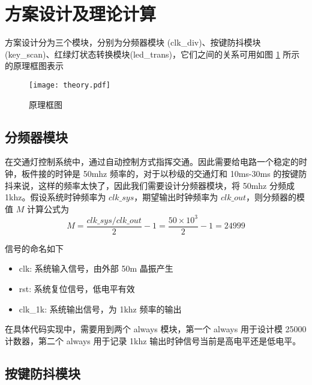 \documentclass[12pt,AutoFakeBold]{article}
\begin{document}
\section{方案设计及理论计算}

方案设计分为三个模块，分别为分频器模块 (clk\_div)、按键防抖模块 (key\_scan)、红绿灯状态转换模块(led\_trans)，它们之间的关系可用如图 \ref{fig:theory} 所示的原理框图表示

\begin{figure}[hbtp]
	\centering
	\texttt{[image: theory.pdf]}
	\caption{原理框图}\label{fig:theory}
\end{figure}

\subsection{分频器模块}

在交通灯控制系统中，通过自动控制方式指挥交通。因此需要给电路一个稳定的时钟，板件接的时钟是 50mhz 频率的，对于以秒级的交通灯和 10ms-30ms 的按键防抖来说，这样的频率太快了，因此我们需要设计分频器模块，将 50mhz 分频成 1khz。假设系统时钟频率为 $clk\_sys$，期望输出时钟频率为 $clk\_out$，则分频器的模值 $M$ 计算公式为
%
\begin{equation*}
M=\frac{clk\_sys/clk\_out}{2}-1=\frac{50\times10^3}{2}-1=24999
\end{equation*}

信号的命名如下
%
\begin{itemize}
	\item clk: 系统输入信号，由外部 50m 晶振产生
	\item rst: 系统复位信号，低电平有效
	\item clk\_1k: 系统输出信号，为 1khz 频率的输出
\end{itemize}
%
在具体代码实现中，需要用到两个 always 模块，第一个 always 用于设计模 25000 计数器，第二个 always 用于记录 1khz 输出时钟信号当前是高电平还是低电平。


\subsection{按键防抖模块}
\end{document}
